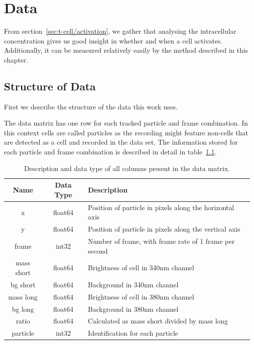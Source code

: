 \chapter{Data}
\label{chapter:data}

From section~\ref{sec:t-cell/activation}, we gather that analysing the intracellular \Calcium concentration gives us good insight in whether and when a cell activates. Additionally, it can be measured relatively easily by the method described in this chapter.

\section{Structure of Data}

First we describe the structure of the data this work uses. 

The data matrix has one row for each tracked particle and frame combination. In this context cells are called particles as the recording might feature non-cells that are detected as a cell and recorded in the data set. The information stored for each particle and frame combination is described in detail in table~\ref{tab:information_data_matrix}.

\begin{table}[h!]
	\centering
	\begin{tabular}{|c|c|l|}
		\hline
		\textbf{Name} & \textbf{Data Type} & \textbf{Description} \\
		\hline
		x & float64 & Position of particle in pixels along the horizontal axis \\
		\hline
		y & float64 & Position of particle in pixels along the vertical axis \\
		\hline
		frame & int32 & Number of frame, with frame rate of 1 frame per second \\
		\hline
		mass short & float64 & Brightness of cell in 340nm channel \\
		\hline
		bg short & float64 & Background in 340nm channel \\
		\hline
		mass long & float64 & Brightness of cell in 380nm channel \\
		\hline
		bg long & float64 & Background in 380nm channel \\
		\hline
		ratio & float64 & Calculated as mass short divided by mass long \\
		\hline
		particle & int32 & Identification for each particle \\
		\hline
	\end{tabular}
	\caption{Description and data type of all columns present in the data matrix.}
	\label{tab:information_data_matrix}
\end{table}

